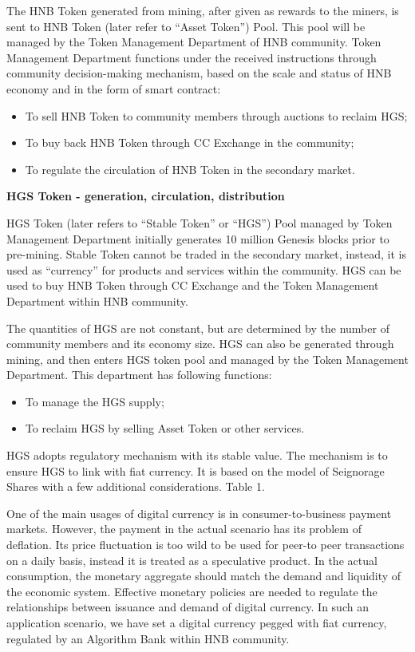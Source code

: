 \documentclass[fleqn,10pt]{SelfArx} %
\begin{document}
The HNB Token generated from mining, after given as rewards to the miners, is sent to HNB Token (later refer to “Asset Token”) Pool. This pool will be managed by the Token Management Department of HNB community.  Token Management Department functions under the received instructions through community decision-making mechanism, based on the scale and status of HNB economy and in the form of smart contract:
\begin{itemize}
\item{To sell HNB Token to community members through auctions to reclaim HGS;}
\item{To buy back HNB Token through CC Exchange in the community;}
\item{To regulate the circulation of HNB Token in the secondary market.}\\
\end{itemize}



\textbf {HGS Token - generation, circulation, distribution}

HGS Token (later refers to “Stable Token” or “HGS”) Pool managed by Token Management Department initially generates 10 million Genesis blocks prior to pre-mining. Stable Token cannot be traded in the secondary market, instead, it is used as “currency” for products and services within the community. HGS can be used to buy HNB Token through CC Exchange and the Token Management Department within HNB community. 

The	quantities of HGS are not constant, but are determined by the number of community members and its economy size. HGS can also be generated through mining, and then enters HGS token pool and managed by the Token Management Department. This department has following functions:
\begin{itemize}
\item{To manage the HGS supply;}
\item{To reclaim HGS by selling Asset Token or other services.}\\
\end{itemize}


HGS adopts regulatory mechanism with its stable value. The mechanism is to ensure HGS to link with fiat currency. It is based on the model of Seignorage Shares with a few additional considerations. Table 1.

 
One of the main usages of digital currency is in consumer-to-business payment markets. However, the payment in the actual scenario has its problem of deflation. Its price fluctuation is too wild to be used for peer-to peer transactions on a daily basis, instead it is treated as a speculative product. In the actual consumption, the monetary aggregate should match the demand and liquidity of the economic system. Effective monetary policies are needed to regulate the relationships between issuance and demand of digital currency. In such an application scenario, we have set a digital currency pegged with fiat currency, regulated by an Algorithm Bank within HNB community.
\end{document}
